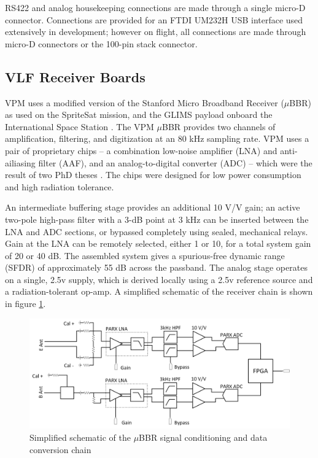 RS422 and analog housekeeping connections are made through a single micro-D connector. Connections are provided for an FTDI UM232H USB interface used extensively in development; however on flight, all connections are made through micro-D connectors or the 100-pin stack connector.

\subsection{VLF Receiver Boards}
VPM uses a modified version of the Stanford Micro Broadband Receiver ($\mu$BBR) as used on the SpriteSat mission, and the GLIMS payload onboard the International Space Station \citep{Ushio2011}. The VPM $\mu$BBR provides two channels of amplification, filtering, and digitization at an 80 kHz sampling rate. VPM uses a pair of proprietary chips -- a combination low-noise amplifier (LNA) and anti-ailiasing filter (AAF), and an analog-to-digital converter (ADC) -- which were the result of two PhD theses \citep{Wang2009, Mossawir2009}. The chips were designed for low power consumption and high radiation tolerance.

An intermediate buffering stage provides an additional 10 V/V gain; an active two-pole high-pass filter with a 3-dB point at 3 kHz can be inserted between the LNA and ADC sections, or bypassed completely using sealed, mechanical relays. Gain at the LNA can be remotely selected, either 1 or 10, for a total system gain of 20 or 40 dB. The assembled system gives a spurious-free dynamic range (SFDR) of approximately 55 dB across the passband. The analog stage operates on a single, 2.5v supply, which is derived locally using a 2.5v reference source and a radiation-tolerant op-amp. A simplified schematic of the receiver chain is shown in figure \ref{fig:ubbr_schem}.

\begin{figure}[t]
\begin{center}
\includegraphics[width=35pc]{figures/vpm_figures/ubbr_schem.png}

\caption{Simplified schematic of the $\mu$BBR signal conditioning and data conversion chain}
\label{fig:ubbr_schem}
\end{center}
\end{figure}

